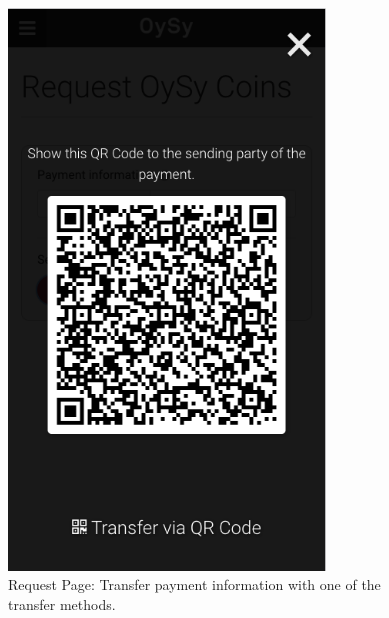 \begin{figure}
\centering
\includegraphics[width=0.75\textwidth]{screenshots/Request-2.png}
\caption{\label{fig:uirequest1}Request Page: Transfer payment information with one of the transfer methods.}
\end{figure}

